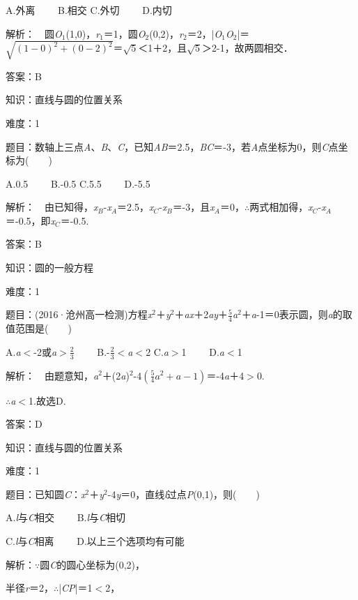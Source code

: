 \documentclass{article} %
\begin{document}
A.外离　　 B.相交 C.外切　　 D.内切

解析：　圆\textit{O}${}_{1}$(1,0)，\textit{r}${}_{1}$＝1，圆\textit{O}${}_{2}$(0,2)，\textit{r}${}_{2}$＝2，|\textit{O}${}_{1}$\textit{O}${}_{2}$|＝$\sqrt{(1-0)^2+(0-2)^2}$＝$\sqrt{5}$＜1＋2，且$\sqrt{5}$＞2-1，故两圆相交．

答案：B

知识：直线与圆的位置关系

难度：1

题目：数轴上三点\textit{A}、\textit{B}、\textit{C}，已知\textit{AB}＝2.5，\textit{BC}＝-3，若\textit{A}点坐标为0，则\textit{C}点坐标为(　　)

A.0.5　　 B.-0.5   C.5.5　　 D.-5.5

解析：　由已知得，\textit{x${}_{B}$}-\textit{x${}_{A}$}＝2.5，\textit{x${}_{C}$}-\textit{x${}_{B}$}＝-3，且\textit{x${}_{A}$}＝0，$\mathrm{\therefore}$两式相加得，\textit{x${}_{C}$}-\textit{x${}_{A}$}＝-0.5，即\textit{x${}_{C}$}＝-0.5.

答案：B

知识：圆的一般方程

难度：1

题目：(2016·沧州高一检测)方程\textit{x}${}^{2}$＋\textit{y}${}^{2}$＋\textit{ax}＋2\textit{ay}＋$\frac{5}{4}$\textit{a}${}^{2}$＋\textit{a}-1＝0表示圆，则\textit{a}的取值范围是(　　)

A.\textit{a}$\mathrm{<}$-2或\textit{a}$\mathrm{>}\frac{2}{3}$　　 B.-$\frac{2}{3}\mathrm{<}$\textit{a}$\mathrm{<}$2  C.\textit{a}$\mathrm{>}$1　　 D.\textit{a}$\mathrm{<}$1

解析：　由题意知，\textit{a}${}^{2}$＋(2\textit{a})${}^{2}$-4$(\frac{5}{4}a^2+a-1)$＝-4\textit{a}＋4$\mathrm{>}$0.

$\mathrm{\therefore}$\textit{a}$\mathrm{<}$1.故选D.

答案：D

知识：直线与圆的位置关系

难度：1

题目：已知圆\textit{C}：\textit{x}${}^{2}$＋\textit{y}${}^{2}$-4\textit{y}＝0，直线\textit{l}过点\textit{P}(0,1)，则(　　)

A.\textit{l}与\textit{C}相交　　  B.\textit{l}与\textit{C}相切 

C.\textit{l}与\textit{C}相离　　  D.以上三个选项均有可能

解析：$\mathrm{\because}$圆\textit{C}的圆心坐标为(0,2)，

半径\textit{r}＝2，$\mathrm{\therefore}$|\textit{CP}|＝1$\mathrm{<}$2，
\end{document}
